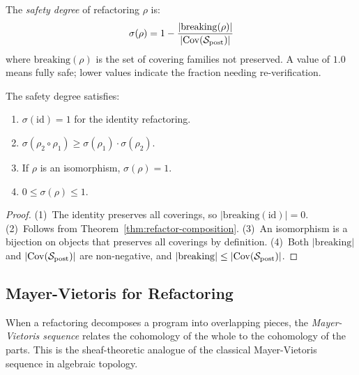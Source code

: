 \documentclass[11pt]{article}
\newcommand{\SitePost}{\Site_{\mathrm{post}}}
\newcommand{\RefactorMorph}{\rho}
\newcommand{\id}{\mathrm{id}}                       %
\newcommand{\SafeDeg}{\sigma}                        %
\begin{document}
\begin{definition}\label{def:safety-degree}
The \emph{safety degree} of refactoring $\RefactorMorph$ is:
\[
  \sigma(\RefactorMorph) = 1 -
    \frac{|\mathrm{breaking}(\RefactorMorph)|}{|\Cov(\SitePost)|}
\]
where $\mathrm{breaking}(\RefactorMorph)$ is the set of covering
families not preserved.  A value of $1.0$ means fully safe; lower values
indicate the fraction needing re-verification.
\end{definition}

\begin{proposition}\label{prop:safety-properties}
The safety degree satisfies:
\begin{enumerate}[noitemsep]
  \item $\SafeDeg(\id) = 1$ for the identity refactoring.
  \item $\SafeDeg(\RefactorMorph_2 \circ \RefactorMorph_1) \geq
        \SafeDeg(\RefactorMorph_1) \cdot \SafeDeg(\RefactorMorph_2)$.
  \item If $\RefactorMorph$ is an isomorphism, $\SafeDeg(\RefactorMorph)
        = 1$.
  \item $0 \leq \SafeDeg(\RefactorMorph) \leq 1$.
\end{enumerate}
\end{proposition}

\begin{proof}
(1)~The identity preserves all coverings, so
$|\mathrm{breaking}(\id)| = 0$.
(2)~Follows from Theorem~\ref{thm:refactor-composition}.
(3)~An isomorphism is a bijection on objects that preserves all
coverings by definition.
(4)~Both $|\mathrm{breaking}|$ and $|\Cov(\SitePost)|$ are
non-negative, and $|\mathrm{breaking}| \leq |\Cov(\SitePost)|$.
\end{proof}

\subsection{Mayer-Vietoris for Refactoring}\label{ssec:mayer-vietoris}

When a refactoring decomposes a program into overlapping pieces, the
\emph{Mayer-Vietoris sequence} relates the cohomology of the whole to
the cohomology of the parts.  This is the sheaf-theoretic analogue of
the classical Mayer-Vietoris sequence in algebraic topology.
\end{document}
